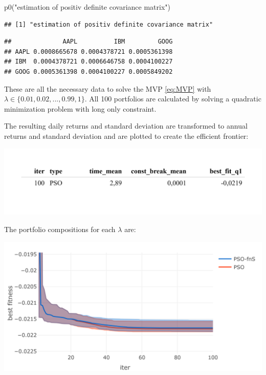 \documentclass[
  oneside]{book}
\newenvironment{Shaded}{\begin{snugshade}}{\end{snugshade}}
\newcommand{\FunctionTok}[1]{\textcolor[rgb]{0.00,0.00,0.00}{#1}}
\newcommand{\NormalTok}[1]{#1}
\newcommand{\OtherTok}[1]{\textcolor[rgb]{0.56,0.35,0.01}{#1}}
\newcommand{\SpecialCharTok}[1]{\textcolor[rgb]{0.00,0.00,0.00}{#1}}
\newcommand{\StringTok}[1]{\textcolor[rgb]{0.31,0.60,0.02}{#1}}
\begin{document}
\begin{Shaded}
\begin{Highlighting}[]
\FunctionTok{p0}\NormalTok{(}\StringTok{"estimation of positiv definite covariance matrix"}\NormalTok{)}
\end{Highlighting}
\end{Shaded}

\begin{verbatim}
## [1] "estimation of positiv definite covariance matrix"
\end{verbatim}

\begin{Shaded}
\end{Shaded}

\begin{verbatim}
##              AAPL          IBM         GOOG
## AAPL 0.0008665678 0.0004378721 0.0005361398
## IBM  0.0004378721 0.0006646758 0.0004100227
## GOOG 0.0005361398 0.0004100227 0.0005849202
\end{verbatim}

These are all the necessary data to solve the MVP \eqref{eq:MVP} with \(\lambda \in \{0.01, 0.02, ..., 0.99, 1\}\). All 100 portfolios are calculated by solving a quadratic minimization problem with long only constraint.

The resulting daily returns and standard deviation are transformed to annual returns and standard deviation and are plotted to create the efficient frontier:

\includegraphics{Master_Thesis_files/figure-latex/unnamed-chunk-9-1.png}

The portfolio compositions for each \(\lambda\) are:

\includegraphics{Master_Thesis_files/figure-latex/unnamed-chunk-10-1.png}
\end{document}
